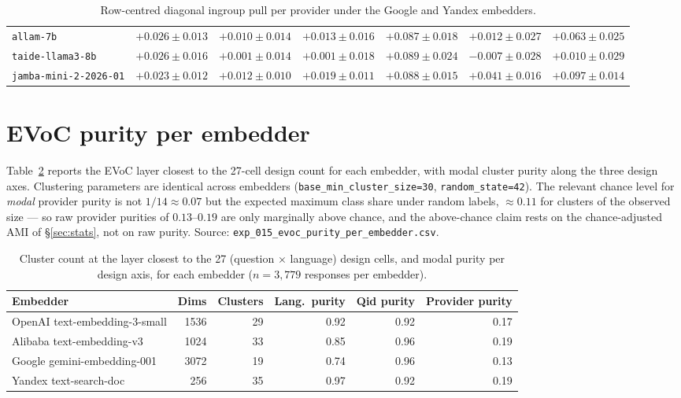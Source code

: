 \begin{table}[!htbp]
{\begin{tabular}{lrrrrrr}
    \texttt{allam-7b} & $+0.026 \pm 0.013$ & $+0.010 \pm 0.014$ & $+0.013 \pm 0.016$ & $+0.087 \pm 0.018$ & $+0.012 \pm 0.027$ & $+0.063 \pm 0.025$ \\
    \texttt{taide-llama3-8b} & $+0.026 \pm 0.016$ & $+0.001 \pm 0.014$ & $+0.001 \pm 0.018$ & $+0.089 \pm 0.024$ & $-0.007 \pm 0.028$ & $+0.010 \pm 0.029$ \\
    \texttt{jamba-mini-2-2026-01} & $+0.023 \pm 0.012$ & $+0.012 \pm 0.010$ & $+0.019 \pm 0.011$ & $+0.088 \pm 0.015$ & $+0.041 \pm 0.016$ & $+0.097 \pm 0.014$ \\
    \hline
  \end{tabular}}
  \caption[Per-embedder diagonal pull (Google, Yandex)]{Row-centred
    diagonal ingroup pull per provider under the Google and Yandex
    embedders.}
  \label{tab:appendix_exp_015_b}
\end{table}

\section{EVoC purity per embedder}\label{sec:appendix_evoc_purity}

Table~\ref{tab:appendix_evoc} reports the EVoC layer closest to the
27-cell design count for each embedder, with modal cluster purity
along the three design axes. Clustering parameters are identical
across embedders (\verb|base_min_cluster_size=30|,
\verb|random_state=42|). The relevant chance level for
\emph{modal} provider purity is not $1/14 \approx 0.07$ but the
expected maximum class share under random labels, ${\approx}0.11$
for clusters of the observed size --- so raw provider purities of
$0.13$--$0.19$ are only marginally above chance, and the
above-chance claim rests on the chance-adjusted AMI of
\S\ref{sec:stats}, not on raw purity. Source:
\verb|exp_015_evoc_purity_per_embedder.csv|.

\begin{table}[!htbp]
  \centering
  \begin{tabular}{lrrrrr}
    \hline
    Embedder & Dims & Clusters & Lang.\ purity & Qid purity & Provider purity \\
    \hline
    OpenAI text-embedding-3-small & 1536 & 29 & 0.92 & 0.92 & 0.17 \\
    Alibaba text-embedding-v3 & 1024 & 33 & 0.85 & 0.96 & 0.19 \\
    Google gemini-embedding-001 & 3072 & 19 & 0.74 & 0.96 & 0.13 \\
    Yandex text-search-doc & 256 & 35 & 0.97 & 0.92 & 0.19 \\
    \hline
  \end{tabular}
  \caption[EVoC purity per embedder]{Cluster count at the layer
    closest to the 27 (question $\times$ language) design cells,
    and modal purity per design axis, for each embedder
    ($n{=}3{,}779$ responses per embedder).}
  \label{tab:appendix_evoc}
\end{table}


